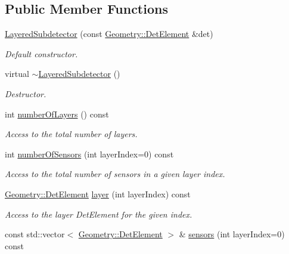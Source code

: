 \subsection*{Public Member Functions}
\begin{DoxyCompactItemize}
\item 
\hyperlink{class_d_d4hep_1_1_d_d_rec_1_1_layered_subdetector_a0897f69fe293527bc70f91840db345ea}{Layered\+Subdetector} (const \hyperlink{class_d_d4hep_1_1_geometry_1_1_det_element}{Geometry\+::\+Det\+Element} \&det)
\begin{DoxyCompactList}\small\item\em Default constructor. \end{DoxyCompactList}\item 
virtual \hyperlink{class_d_d4hep_1_1_d_d_rec_1_1_layered_subdetector_a8fd9a44526c4856456d59fbb36efd6af}{$\sim$\+Layered\+Subdetector} ()
\begin{DoxyCompactList}\small\item\em Destructor. \end{DoxyCompactList}\item 
int \hyperlink{class_d_d4hep_1_1_d_d_rec_1_1_layered_subdetector_add44040c1b0a5578a1fe65d3921a4195}{number\+Of\+Layers} () const
\begin{DoxyCompactList}\small\item\em Access to the total number of layers. \end{DoxyCompactList}\item 
int \hyperlink{class_d_d4hep_1_1_d_d_rec_1_1_layered_subdetector_aab3467193b8abb124076afb0a8642e8e}{number\+Of\+Sensors} (int layer\+Index=0) const
\begin{DoxyCompactList}\small\item\em Access to the total number of sensors in a given layer index. \end{DoxyCompactList}\item 
\hyperlink{class_d_d4hep_1_1_geometry_1_1_det_element}{Geometry\+::\+Det\+Element} \hyperlink{class_d_d4hep_1_1_d_d_rec_1_1_layered_subdetector_abdb74d9734f117f22fa64d32895f71fc}{layer} (int layer\+Index) const
\begin{DoxyCompactList}\small\item\em Access to the layer Det\+Element for the given index. \end{DoxyCompactList}\item 
const std\+::vector$<$ \hyperlink{class_d_d4hep_1_1_geometry_1_1_det_element}{Geometry\+::\+Det\+Element} $>$ \& \hyperlink{class_d_d4hep_1_1_d_d_rec_1_1_layered_subdetector_a432172e452c14a9ad751b46b6cbcceb9}{sensors} (int layer\+Index=0) const

\end{DoxyCompactItemize}
